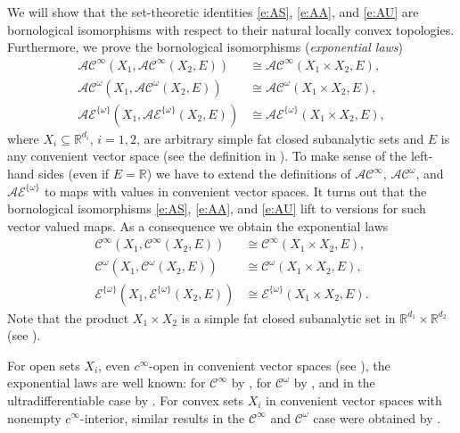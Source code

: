 \documentclass[10pt, reqno]{amsart}
\theoremstyle{plain}
\theoremstyle{definition}
\numberwithin{equation}{section}
\def\om{\omega}
\def\R{\mathbb{R}}
\def\cC{\mathcal{C}}
\def\cE{\mathcal{E}}
\def\AS{\mathcal{AC}^\infty}
\def\AA{\mathcal{AC}^\omega}
\def\AU{\mathcal{AE}^{\{\omega\}}}
\begin{document}
We will show that the set-theoretic identities \eqref{e:AS}, \eqref{e:AA}, and \eqref{e:AU} are bornological 
isomorphisms with respect to their natural locally convex topologies. 
Furthermore, we prove the bornological isomorphisms (\emph{exponential laws})
\begin{align*}
    \AS(X_1,\AS(X_2,E)) &\cong \AS(X_1 \times X_2,E), 
    \\
    \AA(X_1,\AA(X_2,E)) &\cong \AA(X_1 \times X_2,E),
    \\
    \AU(X_1,\AU(X_2,E)) &\cong \AU(X_1 \times X_2,E), 
\end{align*}
where $X_i \subseteq \R^{d_i}$, $i=1,2$, are arbitrary simple fat closed subanalytic sets and $E$ is any convenient vector space (see the definition in ).
To make sense of the left-hand sides (even if $E=\R$) we have to extend the definitions of $\AS$, $\AA$, and $\AU$ to maps with values in convenient vector spaces.
It turns out that the bornological isomorphisms \eqref{e:AS}, \eqref{e:AA}, and \eqref{e:AU} 
lift to versions for such vector valued maps. 
As a consequence we obtain the exponential laws  
\begin{align*}
    \cC^\infty(X_1,\cC^\infty(X_2,E)) &\cong \cC^\infty(X_1 \times X_2,E), 
    \\
    \cC^\om(X_1,\cC^\om(X_2,E)) &\cong \cC^\om(X_1 \times X_2,E),
    \\
    \cE^{\{\om\}}(X_1,\cE^{\{\om\}}(X_2,E)) &\cong \cE^{\{\om\}}(X_1 \times X_2,E). 
\end{align*}
Note that the product $X_1 \times X_2$ is a simple fat closed subanalytic set in $\R^{d_1} \times \R^{d_2}$ (see ).

For open sets $X_i$, even $c^\infty$-open in convenient vector spaces (see ), the exponential laws are well known:
for $\cC^\infty$ by \cite{Froelicher80,Froelicher81,Kriegl82,Kriegl83},
for $\cC^\om$ by \cite{KrieglMichor90}, 
and in the ultradifferentiable case by \cite{KMRc,KMRq,KMRu,Schindl14a}. 
For convex sets $X_i$ in convenient vector spaces with nonempty $c^\infty$-interior,
similar results in the $\cC^\infty$ and $\cC^\om$ case were obtained by \cite{Kriegl97}.
\end{document}
